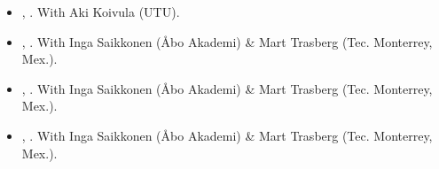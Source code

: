 \begin{itemize}


  	 \item[\textcolor{gray}{\textbullet}] \href{https://raw.githubusercontent.com/hbahamonde/Inequality_Populism_Finland/main/abstract.txt}{\unskip}, {\bf \emph{\unskip}}. With Aki Koivula (UTU).

 	\item[\textcolor{gray}{\textbullet}] \href{https://raw.githubusercontent.com/hbahamonde/democratic_backsliding/main/abstract.txt}{\unskip}, {\bf \emph{\unskip}}. With Inga Saikkonen (\AA bo Akademi) \& Mart Trasberg (Tec. Monterrey, Mex.).

 	\item[\textcolor{gray}{\textbullet}] \href{https://raw.githubusercontent.com/hbahamonde/Users/hectorbahamonde/research/democratic_backsliding/Paper_2/main/abstract.txt}{\unskip}, {\bf \emph{\unskip}}. With Inga Saikkonen (\AA bo Akademi) \& Mart Trasberg (Tec. Monterrey, Mex.).

 	\item[\textcolor{gray}{\textbullet}] \href{https://raw.githubusercontent.com/hbahamonde/Tax_Paper/main/abstract.txt}{\unskip}, {\bf \emph{\unskip}}. With Inga Saikkonen (\AA bo Akademi) \& Mart Trasberg (Tec. Monterrey, Mex.).






\end{itemize}
